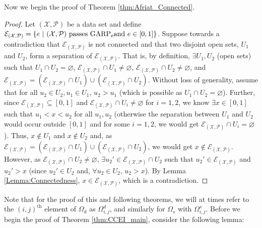 \documentclass{article} %
\theoremstyle{style1}
\theoremstyle{style1}
\theoremstyle{example}
\begin{document}
Now we begin the proof of Theorem \ref{thm:Afriat_Connected}.
\begin{proof}
Let $(\mathcal{X},\mathcal{P})$ be a data set and define $\mathcal{E}_{(\mathcal{X},\mathcal{P})}=\{e\ |\ (\mathcal{X},\mathcal{P})\textrm{ passes GARP\textsubscript{e}}\\ \textrm{and } e\in[0,1]\}$. Suppose towards a contradiction that $\mathcal{E}_{(\mathcal{X},\mathcal{P})}$ is not connected and that two disjoint open sets, $U_1$ and $U_2$, form a separation of $\mathcal{E}_{(\mathcal{X},\mathcal{P})}$. That is, by definition, $\exists U_1,U_2$ (open sets) such that $U_1\cap U_2=\varnothing$, $\mathcal{E}_{(\mathcal{X},\mathcal{P})}\cap U_1\not=\varnothing$, $\mathcal{E}_{(\mathcal{X},\mathcal{P})}\cap U_2\not=\varnothing$, and $\mathcal{E}_{(\mathcal{X},\mathcal{P})}=(\mathcal{E}_{(\mathcal{X},\mathcal{P})}\cap U_1)\cup (\mathcal{E}_{(\mathcal{X},\mathcal{P})}\cap U_2)$. Without loss of generality, assume that for all $u_2\in U_2, u_1\in U_1$, $u_2>u_1$ (which is possible as $U_1\cap U_2=\varnothing$). Further, since $\mathcal{E}_{(\mathcal{X},\mathcal{P})}\subseteq [0,1]$ and $\mathcal{E}_{(\mathcal{X},\mathcal{P})}\cap U_i\not=\varnothing$ for $i=1,2$, we know $\exists x\in[0,1]$ such that $u_1<x<u_2$ for all $u_1,u_2$ (otherwise the separation between $U_1$ and $U_2$ would occur outside $[0,1]$ and for some $i=1,2$, we would get $\mathcal{E}_{(\mathcal{X},\mathcal{P})}\cap U_i=\varnothing$). Thus, $x\not\in U_1$ and $x\not\in U_2$ and, as $\mathcal{E}_{(\mathcal{X},\mathcal{P})}=(\mathcal{E}_{(\mathcal{X},\mathcal{P})}\cap U_1)\cup (\mathcal{E}_{(\mathcal{X},\mathcal{P})}\cap U_2)$, we would get $x\not\in\mathcal{E}_{(\mathcal{X},\mathcal{P})}$. However, as $\mathcal{E}_{(\mathcal{X},\mathcal{P})}\cap U_2\not=\varnothing$, $\exists u_2'\in \mathcal{E}_{(\mathcal{X},\mathcal{P})}\cap U_2$ such that $u_2'\in  \mathcal{E}_{(\mathcal{X},\mathcal{P})}$ and $u_2'>x$ (since $u_2'\in U_2$ and, $\forall u_2\in U_2$, $u_2>x$). By Lemma \ref{Lemma:Connectedness}, $x\in\mathcal{E}_{(\mathcal{X},\mathcal{P})}$, which is a contradiction.
\end{proof}



\CCEImain*

Note that for the proof of this and following theorems, we will at times refer to the $(i,j)^{\textrm{th}}$ element of $\Omega_d$ as $\Omega^d_{i,j}$, and similarly for $\Omega_s$ with $\Omega^s_{i,j}$. Before we begin the proof of Theorem \ref{thm:CCEI_main}, consider the following lemma:
\end{document}

